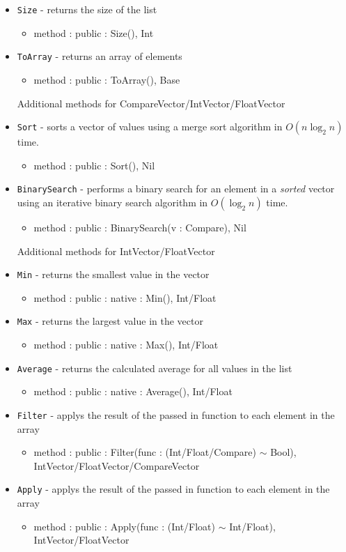 \documentclass[12pt]{article}
\begin{document}
\begin{itemize}
\begin{itemize}
	\end{itemize}
    \item \texttt{Size} - returns the size of the list
    	\begin{itemize}
	\item method : public : Size(), Int
	\end{itemize}
    \item \texttt{ToArray} - returns an array of elements
    	\begin{itemize}
	\item method : public : ToArray(), Base
	\end{itemize}
Additional methods for CompareVector/IntVector/FloatVector
    \item \texttt{Sort} - sorts a vector of values using a merge sort algorithm in $O(n \log_2 n)$ time.
    	\begin{itemize}
	\item method : public : Sort(), Nil
	\end{itemize}
    \item \texttt{BinarySearch} - performs a binary search for an element in a \emph{sorted} vector using an iterative binary search algorithm in $O(\log_2 n)$ time.
    	\begin{itemize}
	\item method : public : BinarySearch(v : Compare), Nil
	\end{itemize}
Additional methods for IntVector/FloatVector
    \item \texttt{Min} - returns the smallest value in the vector
    	\begin{itemize}
	\item method : public : native : Min(), Int/Float
	\end{itemize}
    \item \texttt{Max} - returns the largest value in the vector
    	\begin{itemize}
	\item method : public : native : Max(), Int/Float
	\end{itemize}
    \item \texttt{Average} - returns the calculated average for all values in the list
    	\begin{itemize}
	\item method : public : native : Average(), Int/Float
	\end{itemize}
    \item \texttt{Filter} - applys the result of the passed in function to each element in the array 
    	\begin{itemize}
	\item method : public : Filter(func : (Int/Float/Compare) $\sim$ Bool), IntVector/FloatVector/CompareVector
	\end{itemize}
    \item \texttt{Apply} - applys the result of the passed in function to each element in the array 
    	\begin{itemize}
	\item method : public : Apply(func : (Int/Float) $\sim$ Int/Float), IntVector/FloatVector
	\end{itemize}
\end{itemize}
\end{document}

